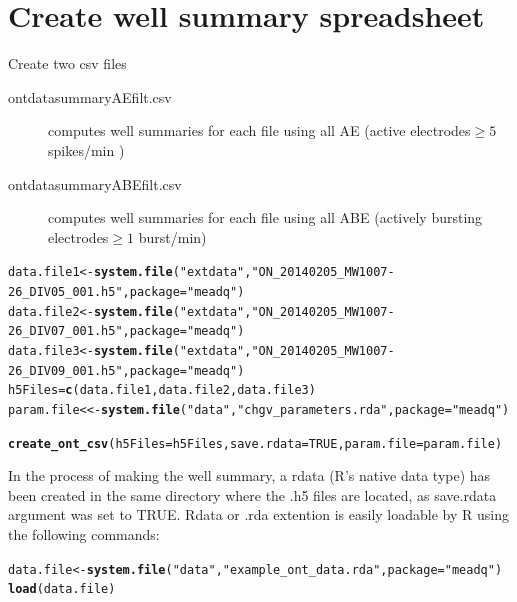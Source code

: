 \documentclass{article}\usepackage[]{graphicx}\usepackage[]{color}
\makeatletter
\newcommand{\hlnum}[1]{\textcolor[rgb]{0.686,0.059,0.569}{#1}}%
\newcommand{\hlstr}[1]{\textcolor[rgb]{0.192,0.494,0.8}{#1}}%
\newcommand{\hlstd}[1]{\textcolor[rgb]{0.345,0.345,0.345}{#1}}%
\newcommand{\hlkwb}[1]{\textcolor[rgb]{0.69,0.353,0.396}{#1}}%
\newcommand{\hlkwc}[1]{\textcolor[rgb]{0.333,0.667,0.333}{#1}}%
\newcommand{\hlkwd}[1]{\textcolor[rgb]{0.737,0.353,0.396}{\textbf{#1}}}%
\newenvironment{kframe}{%
 \def\at@end@of@kframe{}%
 \ifinner\ifhmode%
  \def\at@end@of@kframe{\end{minipage}}%
  \begin{minipage}{\columnwidth}%
 \fi\fi%
 \def\FrameCommand##1{\hskip\@totalleftmargin \hskip-\fboxsep
 \colorbox{shadecolor}{##1}\hskip-\fboxsep
     \hskip-\linewidth \hskip-\@totalleftmargin \hskip\columnwidth}%
 \MakeFramed {\advance\hsize-\width
   \@totalleftmargin\z@ \linewidth\hsize
   \@setminipage}}%
 {\par\unskip\endMakeFramed%
 \at@end@of@kframe}
\newenvironment{knitrout}{}{} %
\makeatother
\begin{document}
\section*{Create well summary spreadsheet}
Create two csv files \colon

\begin{description}
\item[ ont\textunderscore data\textunderscore summary\textunderscore AEfilt.csv] computes well summaries for each file using all AE (active electrodes\colon  $\geq 5$ spikes/min ) 
\item[ ont\textunderscore data\textunderscore summary\textunderscore ABEfilt.csv] computes well summaries for each file using all ABE (actively bursting electrodes\colon  $\geq 1$ burst/min)
\end{description}

\begin{knitrout}
\color{fgcolor}\begin{kframe}
\begin{alltt}
\hlstd{data.file1} \hlkwb{<-} \hlkwd{system.file}\hlstd{(}\hlstr{"extdata"}\hlstd{,} \hlstr{"ON_20140205_MW1007-26_DIV05_001.h5"}\hlstd{,} \hlkwc{package} \hlstd{=} \hlstr{"meadq"}\hlstd{)}
\hlstd{data.file2} \hlkwb{<-} \hlkwd{system.file}\hlstd{(}\hlstr{"extdata"}\hlstd{,} \hlstr{"ON_20140205_MW1007-26_DIV07_001.h5"}\hlstd{,} \hlkwc{package} \hlstd{=} \hlstr{"meadq"}\hlstd{)}
\hlstd{data.file3} \hlkwb{<-} \hlkwd{system.file}\hlstd{(}\hlstr{"extdata"}\hlstd{,} \hlstr{"ON_20140205_MW1007-26_DIV09_001.h5"}\hlstd{,} \hlkwc{package} \hlstd{=} \hlstr{"meadq"}\hlstd{)}
\hlstd{h5Files} \hlkwb{=} \hlkwd{c}\hlstd{(data.file1, data.file2, data.file3)}
\hlstd{param.file} \hlkwb{<<-} \hlkwd{system.file}\hlstd{(}\hlstr{"data"}\hlstd{,} \hlstr{"chgv_parameters.rda"}\hlstd{,} \hlkwc{package} \hlstd{=} \hlstr{"meadq"}\hlstd{)}

\hlkwd{create_ont_csv}\hlstd{(}\hlkwc{h5Files} \hlstd{= h5Files,} \hlkwc{save.rdata} \hlstd{=} \hlnum{TRUE}\hlstd{,} \hlkwc{param.file} \hlstd{= param.file)}
\end{alltt}
\end{kframe}
\end{knitrout}



In the process of making the well summary, a rdata (R's native data type) has been created in the same directory where the .h5 files are located, as save.rdata argument was set to TRUE.  Rdata or .rda extention is easily loadable by R using the following commands:
\begin{knitrout}
\color{fgcolor}\begin{kframe}
\begin{alltt}
\hlstd{data.file} \hlkwb{<-} \hlkwd{system.file}\hlstd{(}\hlstr{"data"}\hlstd{,} \hlstr{"example_ont_data.rda"}\hlstd{,} \hlkwc{package} \hlstd{=} \hlstr{"meadq"}\hlstd{)}
\hlkwd{load}\hlstd{(data.file)}
\end{alltt}
\end{kframe}
\end{knitrout}
\end{document}

